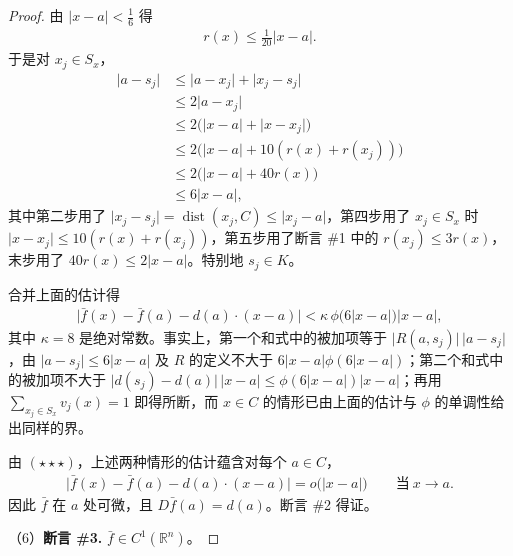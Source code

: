 \documentclass[../../main.tex]{subfiles}%
\begin{document}
\begin{proof}
由 $\lvert x-a\rvert<\frac{1}{6}$ 得
\begin{align*}
r(x)\leqslant\frac{1}{20}\lvert x-a\rvert.
\end{align*}
于是对 $x_j\in S_x$，
\begin{align*}
\lvert a-s_j\rvert&\leqslant\lvert a-x_j\rvert+\lvert x_j-s_j\rvert\\
&\leqslant2\lvert a-x_j\rvert\\
&\leqslant2\bigl(\lvert x-a\rvert+\lvert x-x_j\rvert\bigr)\\
&\leqslant2\bigl(\lvert x-a\rvert+10(r(x)+r(x_j))\bigr)\\
&\leqslant2\bigl(\lvert x-a\rvert+40r(x)\bigr)\\
&\leqslant6\lvert x-a\rvert,
\end{align*}
其中第二步用了 $\lvert x_j-s_j\rvert=\operatorname{dist}(x_j,C)\leqslant\lvert x_j-a\rvert$，第四步用了 $x_j\in S_x$ 时 $\lvert x-x_j\rvert\leqslant10(r(x)+r(x_j))$，第五步用了断言 \#1 中的 $r(x_j)\leqslant3r(x)$，末步用了 $40r(x)\leqslant2\lvert x-a\rvert$。特别地 $s_j\in K$。

合并上面的估计得
\begin{align*}
\bigl\lvert\bar f(x)-\bar f(a)-d(a)\cdot(x-a)\bigr\rvert<\kappa\,\phi\bigl(6\lvert x-a\rvert\bigr)\lvert x-a\rvert,
\end{align*}
其中 $\kappa=8$ 是绝对常数。事实上，第一个和式中的被加项等于 $\lvert R(a,s_j)\rvert\,\lvert a-s_j\rvert$，由 $\lvert a-s_j\rvert\leqslant6\lvert x-a\rvert$ 及 $R$ 的定义不大于 $6\lvert x-a\rvert\phi(6\lvert x-a\rvert)$；第二个和式中的被加项不大于 $\lvert d(s_j)-d(a)\rvert\,\lvert x-a\rvert\leqslant\phi(6\lvert x-a\rvert)\lvert x-a\rvert$；再用 $\sum_{x_j\in S_x}v_j(x)=1$ 即得所断，而 $x\in C$ 的情形已由上面的估计与 $\phi$ 的单调性给出同样的界。

由 $(\star\star\star)$，上述两种情形的估计蕴含对每个 $a\in C$，
\begin{align*}
\bigl\lvert\bar f(x)-\bar f(a)-d(a)\cdot(x-a)\bigr\rvert=o\bigl(\lvert x-a\rvert\bigr)\qquad\text{当}\ x\to a.
\end{align*}
因此 $\bar f$ 在 $a$ 处可微，且 $D\bar f(a)=d(a)$。断言 \#2 得证。

（6）\textbf{断言 \#3.} $\bar f\in C^1(\mathbb{R}^n)$。


\end{proof}
\end{document}
